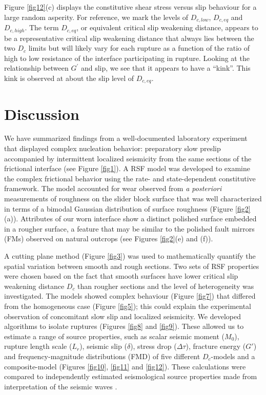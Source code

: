 \documentclass[preprint,1p, 10pt,authoryear]{elsarticle}
\begin{document}
Figure \ref{fig12}(c) displays the constitutive shear stress versus slip behaviour for a large random asperity. For reference, we mark the levels of $D_{c,low}$, $D_{c,eq}$ and $D_{c, high}$.  The term $D_{c,eq}$, or equivalent critical slip weakening distance, appears to be a representative critical slip weakening distance that always lies between the two $D_{c}$ limits but will likely vary for each rupture as a function of the ratio of high to low resistance of the interface participating in rupture. Looking at the relationship between $G^{'}$ and slip, we see that it appears to have a ``kink''.  This kink is observed at about the slip level of $D_{c,eq}$. 

\section{Discussion}
We have summarized findings from a well-documented laboratory experiment \citep{Selvadurai2015, Selvadurai2017, Selvadurai2019} that displayed complex nucleation behavior: preparatory slow preslip accompanied by intermittent localized seismicity from the same sections of the frictional interface (see Figure \ref{fig1}). A RSF model was developed to examine the complex frictional behavior using the rate- and state-dependent constitutive framework. The model accounted for wear observed from \textit{a posteriori} measurements of roughness on the slider block surface that was well characterized in terms of a bimodal Gaussian distribution of surface roughness (Figure \ref{fig2}(a)). Attributes of our worn interface show a distinct polished surface embedded in a rougher surface, a feature that may be similar to the polished fault mirrors (FMs) observed on natural outcrops (see Figures \ref{fig2}(e) and (f)).

A cutting plane method (Figure \ref{fig3}) was used to mathematically quantify the spatial variation between smooth and rough sections. Two sets of RSF properties were chosen based on the fact that smooth surfaces have lower critical slip weakening distance $D_{c}$ than rougher sections and the level of heterogeneity was investigated. The models showed complex behaviour (Figure \ref{fig7}) that differed from the homogeneous case (Figure \ref{fig5}); this could explain the experimental observation of concomitant slow slip and localized seismicity.  We developed algorithms to isolate ruptures (Figures \ref{fig8} and \ref{fig9}).  These allowed us to estimate a range of source properties, such as scalar seismic moment ($M_{0}$), rupture length scale ($L_{r}$), seismic slip ($\delta$), stress drop ($\Delta\tau$), fracture energy ($G'$) and frequency-magnitude distributions (FMD) of five different $D_{c}$-models and a composite-model (Figures \ref{fig10}, \ref{fig11} and \ref{fig12}). These calculations were compared to independently estimated seismological source properties made from interpretation of the seismic waves \citep{Selvadurai2019}.
\end{document}
